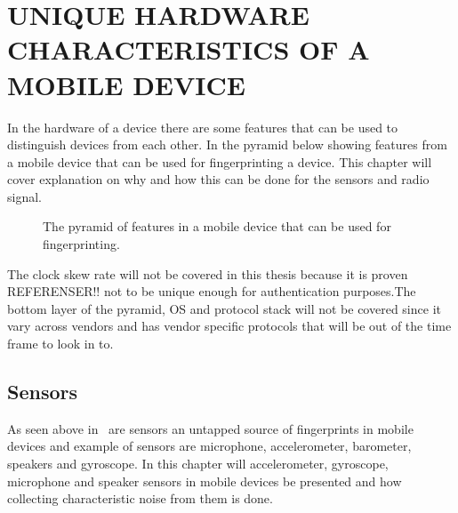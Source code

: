 \chapter{UNIQUE HARDWARE CHARACTERISTICS OF A MOBILE DEVICE}\label{cha:character}
In the hardware of a device there are some features that can be used to distinguish devices from each other. In the pyramid below showing features from a mobile device that can be used for fingerprinting a device. This chapter will cover explanation on why and how this can be done for the sensors and radio signal.
\begin{figure}[!h]
	
	\caption{\label{fig:pyramid} The pyramid of features in a mobile device that can be used for fingerprinting.\cite[]{sensor:acoustic}}
\end{figure}
The clock skew rate will not be covered in this thesis because it is proven REFERENSER!! not to be unique enough for authentication purposes.The bottom layer of the pyramid, OS and protocol stack will not be covered since it vary across vendors and has vendor specific protocols that will be out of the time frame to look in to.

\section{Sensors}\label{sec:sensors}
As seen above in~ are sensors an untapped source of fingerprints in mobile devices and example of sensors are microphone, accelerometer, barometer, speakers and gyroscope. In this chapter will accelerometer, gyroscope, microphone and speaker sensors in mobile devices be presented and how collecting characteristic noise from them is done.

